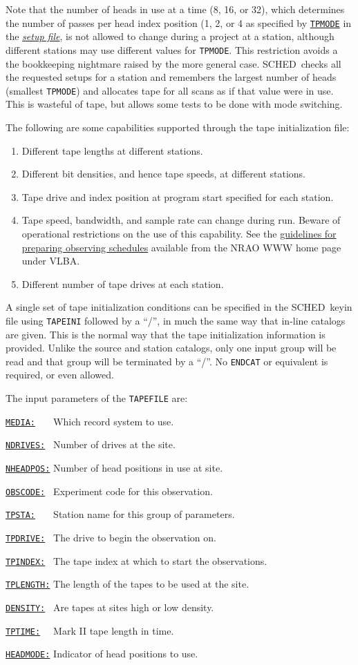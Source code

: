 \documentclass{report}
\newcommand{\schedb}{{\sc SCHED~}}
\newcommand{\htlu}[2]%
{\item
  \hyperref[TP:#1]{{\tt #1:}}{\tt #2}%
}
\begin{document}
Note that the number of heads in use at a time (8, 16, or 32), which
determines the number of passes per head index position (1, 2, or 4 as
specified by 
{\hyperref[SP:TPMODE]{{\tt TPMODE}}} in the 
{\hyperref[SEC:SETUPS]{{\sl setup file}}},
is not allowed to change during a project
at a station, although different stations may use different values for
{\tt TPMODE}.  This restriction avoids a the bookkeeping nightmare
raised by the more general case.  \schedb checks all the requested
setups for a station and remembers the largest number of heads
(smallest {\tt TPMODE}) and allocates tape for all scans as if that
value were in use.  This is wasteful of tape, but allows some tests to
be done with mode switching.

The following are some capabilities supported through the tape initialization
file:

\begin{enumerate}
\item Different tape lengths at different stations.

\item Different bit densities, and hence tape speeds, at different
stations.

\item Tape drive and index position at program start specified for
each station.

\item Tape speed, bandwidth, and sample rate can change during run.
Beware of operational restrictions on the use of this capability.
See the 
{\href{http://www.aoc.nrao.edu/vlba/obstatus/guidelines.ps}{guidelines for preparing observing schedules}}
available from the NRAO WWW home page under VLBA.

\item Different number of tape drives at each station.
\end{enumerate}

A single set of tape initialization conditions can be specified in the
\schedb keyin file using {\tt TAPEINI} followed by a ``/'', in
much the same way that in-line catalogs are given. This is the normal
way that the tape initialization information is provided.  Unlike
the source and station catalogs, only one input group will be read and
that group will be terminated by a ``/''.  No {\tt ENDCAT} or
equivalent is required, or even allowed.

The input parameters of the {\tt TAPEFILE} are:

\begin{list}{~}{\parsep 0em  \itemsep 0em }
\htlu{MEDIA}{~~~} Which record system to use.
\htlu{NDRIVES}{~} Number of drives at the site.
\htlu{NHEADPOS}{} Number of head positions in use at site.
\htlu{OBSCODE}{~} Experiment code for this observation.
\htlu{TPSTA}{~~~} Station name for this group of parameters.
\htlu{TPDRIVE}{~} The drive to begin the observation on.
\htlu{TPINDEX}{~} The tape index at which to start the observations.
\htlu{TPLENGTH}{} The length of the tapes to be used at the site.
\htlu{DENSITY}{~} Are tapes at sites high or low density.
\htlu{TPTIME}{~~} Mark II tape length in time.
\htlu{HEADMODE}{} Indicator of head positions to use.
\end{list}
\end{document}
